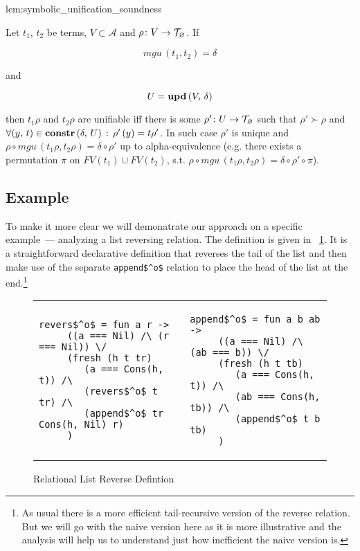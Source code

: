 \begin{replemma}{lem:symbolic_unification_soundness}

  Let $t_1$, $t_2$ be terms,  $V \subset \mathcal{A}$ and $\rho \colon V \to \mathcal{T}_{\varnothing}$. If

  \[ mgu\,(t_1, t_2) = \delta \]

  and

  \[ U = \mbox{\textbf{upd}}\,(V,\, \delta) \]

  then $t_1 \rho$ and $t_2 \rho$ are unifiable iff there is some $\rho' \colon U \to \mathcal{T}_{\varnothing}$ such that $\rho' \succ \rho$ and $\forall (y, \, t) \in \mbox{\textbf{constr}}\,(\delta,\, U)\,:\, \rho'\,(y) = t \rho'$.
In such case $\rho'$ is unique and $ \rho \circ mgu\,(t_1 \rho, t_2 \rho) = \delta\circ\rho' $ up to alpha-equivalence (e.g. there exists a permutation $\pi$ on $FV(t_1) \cup FV(t_2)$, s.t. $ \rho \circ mgu\,(t_1 \rho, t_2 \rho) = \delta \circ\rho'\circ \pi$).
\end{replemma}

\subsection{Example}

To make it more clear we will demonatrate our approach on a specific example~--- analyzing a list reversing relation. The definition is given in \figureword~\ref{fig:reverso_definition}. It is a straightforward declarative definition that reverses the tail of the list and then make use of the separate \lstinline|append$^o$| relation to place the head of the list at the end.\footnote{As usual there is a more efficient tail-recursive version of the reverse relation. But we will go with the naive version here as it is more illustrative and the analysis will help us to understand just how inefficient the naive version is.}

\begin{figure}[t]
\begin{tabular}{p{6cm}p{6cm}}
\begin{lstlisting}[basicstyle=\small]
   revers$^o$ = fun a r ->
     ((a === Nil) /\ (r === Nil)) \/
     (fresh (h t tr)
        (a === Cons(h, t)) /\
        (revers$^o$ t tr) /\
        (append$^o$ tr Cons(h, Nil) r)
     )
\end{lstlisting} &
\begin{lstlisting}[basicstyle=\small]
   append$^o$ = fun a b ab ->
     ((a === Nil) /\ (ab === b)) \/
     (fresh (h t tb)
        (a === Cons(h, t)) /\
        (ab === Cons(h, tb)) /\
        (append$^o$ t b tb)
     )
\end{lstlisting}
\end{tabular}

\caption{Relational List Reverse Defintion}
\label{fig:reverso_definition}
\end{figure}


